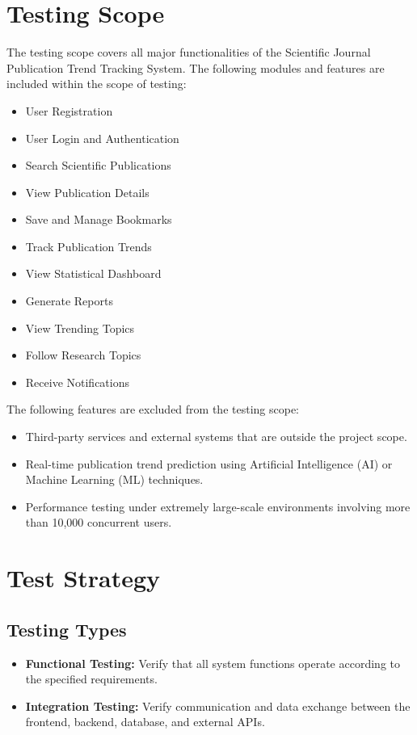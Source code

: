 \documentclass[12pt,a4paper]{article}
\begin{document}
{{\section{Testing Scope}
The testing scope covers all major functionalities of the Scientific Journal
Publication Trend Tracking System. The following modules and features are included
within the scope of testing:
\begin{itemize}
	\item User Registration
	\item User Login and Authentication
	\item Search Scientific Publications
	\item View Publication Details
	\item Save and Manage Bookmarks
	\item Track Publication Trends
	\item View Statistical Dashboard
	\item Generate Reports 
	\item View Trending Topics
	\item Follow Research Topics
	\item Receive Notifications
	
\end{itemize}
The following features are excluded from the testing scope:
\begin{itemize}
	\item Third-party services and external systems that are outside the project scope.
	\item Real-time publication trend prediction using Artificial Intelligence (AI)
	or Machine Learning (ML) techniques.
	\item Performance testing under extremely large-scale environments involving
	more than 10,000 concurrent users.
\end{itemize}

\section{Test Strategy}
\subsection{Testing Types}
\begin{itemize}
	\item \textbf{Functional Testing:} Verify that all system functions operate according to the specified requirements.
	
	\item \textbf{Integration Testing:} Verify communication and data exchange between the frontend, backend, database, and external APIs.
	

\end{itemize}}}
\end{document}
